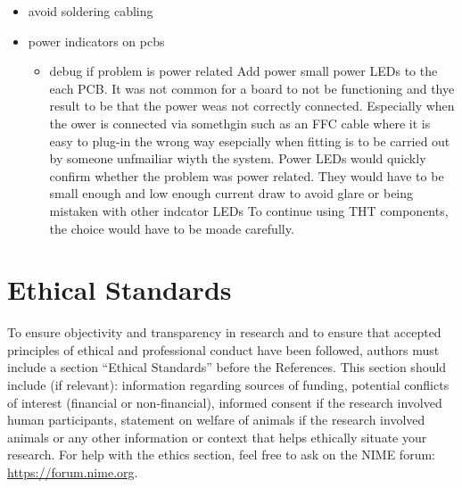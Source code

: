 \begin{itemize}
\item
  avoid soldering cabling
\item
  power indicators on pcbs

  \begin{itemize}
  \item
    debug if problem is power related Add power small power LEDs to the
    each PCB. It was not common for a board to not be functioning and
    thye result to be that the power weas not correctly connected.
    Especially when the ower is connected via somethgin such as an FFC
    cable where it is easy to plug-in the wrong way esepcially when
    fitting is to be carried out by someone unfmailiar wiyth the system.
    Power LEDs would quickly confirm whether the problem was power
    related. They would have to be small enough and low enough current
    draw to avoid glare or being mistaken with other indcator LEDs To
    continue using THT components, the choice would have to be moade
    carefully.
  \end{itemize}
\end{itemize}

\section{Ethical Standards}\label{ethical-standards}

To ensure objectivity and transparency in research and to ensure that
accepted principles of ethical and professional conduct have been
followed, authors must include a section ``Ethical Standards'' before
the References. This section should include (if relevant): information
regarding sources of funding, potential conflicts of interest (financial
or non-financial), informed consent if the research involved human
participants, statement on welfare of animals if the research involved
animals or any other information or context that helps ethically situate
your research. For help with the ethics section, feel free to ask on the
NIME forum: \url{https://forum.nime.org}.
